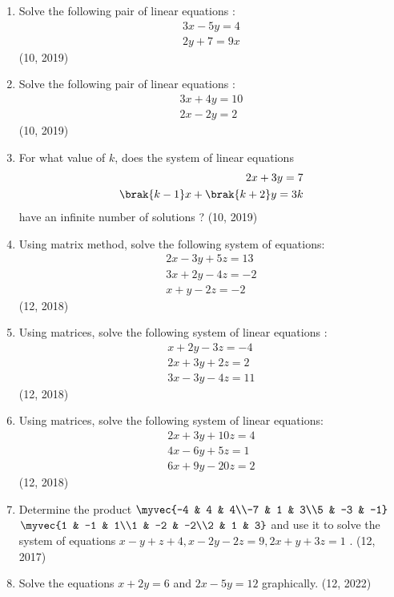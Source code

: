 \begin{enumerate}[label=\thesubsection.\arabic*,ref=\thesubsection.\theenumi]
\item Solve the following pair of linear equations :
\begin{align*}
 3x - 5y = 4\\
2y + 7 = 9x   
\end{align*}    
\hfill (10, 2019)

\item Solve the following pair of linear equations :
\begin{align*}
 3x + 4y = 10\\
2x - 2y = 2   
\end{align*}    
\hfill (10, 2019)
\item For what value of $k$, does the system of linear equations
\begin{align*}
   2x + 3y = 7\\
 \brak{k - 1} x + \brak{k + 2} y = 3k
\end{align*}
have an infinite number of solutions ?
\hfill (10, 2019)
\item Using matrix method, solve the following system of equations: \begin{align*}
  2{x}-3{y}+5{z}=13 \\  3{x}+2{y}-4{z}=-2 \\
  {x}+{y}-2{z}=-2
 \end{align*}
\hfill (12, 2018)
\item Using matrices, solve the following system of linear equations :
	\begin{align*}
		x+2y-3z=-4\\
		2x+3y+2z=2\\
		3x-3y-4z=11
	\end{align*}
\hfill (12, 2018)
\item Using matrices, solve the following system of linear equations:
 \begin{align*}
  2x+3y+10z=4\\
  4x-6y+5z=1\\
  6x+9y-20z=2
 \end{align*}
\hfill (12, 2018)
\item Determine the product	$\myvec{-4 & 4 & 4\\-7 & 1 & 3\\5 & -3 & -1}$ $\myvec{1 & -1 &  1\\1 & -2 & -2\\2 &  1 &  3}$ and use it to solve the system of equations $x-y+z+4, x-2y-2z=9, 2x+y+3z=1$ .
\hfill (12, 2017)
\item Solve the equations $x+2y=6$ and $2x-5y=12$ graphically. \hfill (12, 2022)

\end{enumerate}
